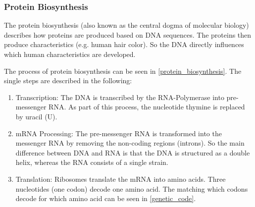 
\subsubsection{Protein Biosynthesis} \label{fundamentalsAb}

The protein biosynthesis (also known as the central dogma of molecular biology) describes how proteins are produced based on \ac{DNA} sequences. The proteins then produce characteristics (e.g. human hair color). So the \ac{DNA} directly influences which human characteristics are developed. \cite[p. 6]{schererStatisticalGeneticsGenetic2021}

The process of protein biosynthesis can be seen in \autoref{protein_biosynthesis}. The single steps are described in the following:
\begin{enumerate}
	\item Transcription: The \ac{DNA} is transcribed by the RNA-Polymerase into pre-messenger RNA. As part of this process, the nucleotide thymine is replaced by uracil (U). \cite[p. 9]{schererStatisticalGeneticsGenetic2021}
	\item mRNA Processing: The pre-messenger RNA is transformed into the messenger RNA by removing the non-coding regions (introns). So the main difference between \ac{DNA} and \ac{RNA} is that the \ac{DNA} is structured as a double helix, whereas the \ac{RNA} consists of a single strain. \cite[p. 9]{schererStatisticalGeneticsGenetic2021}
	\item Translation: Ribosomes translate the mRNA into amino acids. Three nucleotides (one codon) decode one amino acid. The matching which codons decode for which amino acid can be seen in \autoref{genetic_code}. \cite[p. 9]{schererStatisticalGeneticsGenetic2021}
\end{enumerate}

